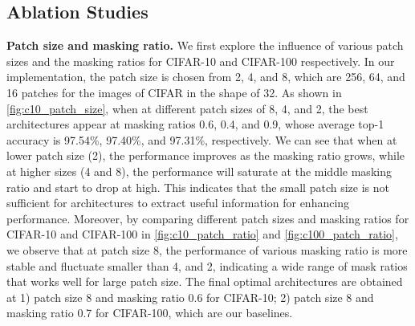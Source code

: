 \documentclass[10pt,twocolumn,letterpaper]{article}
\newcommand{\mypara}[1]{\vspace{1mm}\noindent\textbf{#1}}
\begin{document}
\subsection{Ablation Studies}
\label{sec:ablation}
\vspace{-4pt}
\mypara{Patch size and masking ratio.}
We first explore the influence of various patch sizes and the masking ratios for CIFAR-10 and CIFAR-100 respectively.
In our implementation, the patch size is chosen from 2, 4, and 8, which are 256, 64, and 16 patches for the images of CIFAR in the shape of 32.
As shown in \cref{fig:c10_patch_size}, when at different patch sizes of 8, 4, and 2, the best architectures appear at masking ratios 0.6, 0.4, and 0.9, whose average top-1 accuracy is 97.54\%, 97.40\%, and 97.31\%, respectively.
We can see that when at lower patch size (2), the performance improves as the masking ratio grows, while at higher sizes (4 and 8), the performance will saturate at the middle masking ratio and start to drop at high.
This indicates that the small patch size is not sufficient for architectures to extract useful information for enhancing performance.
Moreover, by comparing different patch sizes and masking ratios for CIFAR-10 and CIFAR-100 in \cref{fig:c10_patch_ratio} and \cref{fig:c100_patch_ratio}, we observe that at patch size 8, 
the performance of various masking ratio is more stable and fluctuate smaller than 4, and 2, indicating a wide range of mask ratios that works well for large patch size.
The final optimal architectures are obtained at 1) patch size 8 and masking ratio 0.6 for CIFAR-10; 2) patch size 8 and masking ratio 0.7 for CIFAR-100, which are our baselines.
\end{document}

